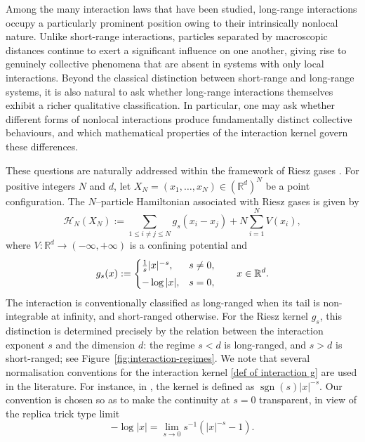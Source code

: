\documentclass{amsart}
\def\R{\mathbb{R}}
\newcommand{\sgn}{\operatorname{sgn}}
\theoremstyle{plain}
\theoremstyle{remark}
\numberwithin{equation}{section}
\begin{document}
Among the many interaction laws that have been studied, long-range interactions occupy a particularly prominent position owing to their intrinsically nonlocal nature. Unlike short-range interactions, particles separated by macroscopic distances continue to exert a significant influence on one another, giving rise to genuinely collective phenomena that are absent in systems with only local interactions.  
Beyond the classical distinction between short-range and long-range
systems, it is also natural to ask whether long-range interactions
themselves exhibit a richer qualitative classification. 
In particular, one may ask whether different forms of nonlocal interactions produce fundamentally distinct collective behaviours, and which mathematical properties of the interaction kernel govern these differences.

These questions are naturally addressed within the framework of Riesz
gases \cite{Lew22,Se24}. For positive integers \(N\) and \(d\), let $X_N=(x_1,\ldots,x_N)\in(\mathbb{R}^d)^N$ be a point configuration.  
The $N$–particle Hamiltonian associated with Riesz gases is given by 
\begin{equation}  \label{def of Hamiltonian}
\mathcal{H}_N(X_N) := \sum_{1 \le i \ne j \le N} g_s(x_i - x_j) 
+ N \sum_{i=1}^N V(x_i),
\end{equation}
where $V:\mathbb{R}^d\to(-\infty,+\infty)$ is a confining potential and  
\begin{equation}
\label{def of interaction g}
g_s(x)  := \begin{cases}
\frac{ 1 }{s} |x|^{-s}, & s \ne 0, 
\smallskip 
\\
-\log|x|, & s = 0 , 
\end{cases} \qquad x \in \R^d. 
\end{equation} 
The interaction is conventionally classified as long-ranged when its
tail is non-integrable at infinity, and short-ranged otherwise. For the
Riesz kernel $g_s$, this distinction is determined precisely by the relation between the interaction exponent \(s\) and the dimension \(d\):
the regime \(s<d\) is long-ranged, and \(s>d\) is short-ranged; see Figure~\ref{fig:interaction-regimes}.  
We note that several normalisation conventions for the interaction kernel \eqref{def of interaction g} are used in the literature. For instance, in \cite{Lew22}, the kernel is defined as $\sgn(s)|x|^{-s}$. Our convention is chosen so as to make the continuity at \(s=0\) transparent, in view of the replica trick type limit
\begin{equation}
-\log |x|= \lim_{s\to 0} s^{-1}( |x|^{-s}-1 ) .
\end{equation}  
\end{document}
